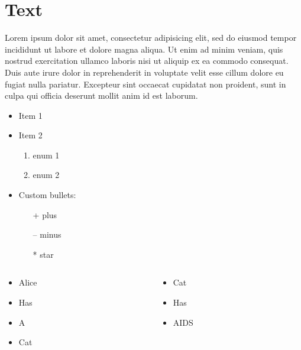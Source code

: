 \section{Text}


{
\begin{multicols}{2}
Lorem ipsum dolor sit amet, consectetur adipisicing elit, sed do eiusmod tempor incididunt ut labore et dolore magna aliqua. Ut enim ad minim veniam, quis nostrud exercitation ullamco laboris nisi ut aliquip ex ea commodo consequat. Duis aute irure dolor in reprehenderit in voluptate velit esse cillum dolore eu fugiat nulla pariatur. Excepteur sint occaecat cupidatat non proident, sunt in culpa qui officia deserunt mollit anim id est laborum.
\end{multicols}
}


{
\begin{itemize}
\item Item 1
\pause

\item Item 2
\begin{enumerate}
\item enum 1
\item enum 2
\end{enumerate}
\pause

\item Custom bullets:
\begin{enumerate}
\item[+] plus
\item[--] minus
\item[*] star
\end{enumerate}
\end{itemize}
}


{
\begin{columns}

\begin{column}{0.45\textwidth}
\begin{itemize}
\item Alice
\item Has
\item A
\item Cat
\end{itemize}
\end{column}

\begin{column}{0.45\textwidth}
\begin{itemize}
\item Cat
\item Has
\item AIDS
\end{itemize}
\end{column}

\end{columns}
}


